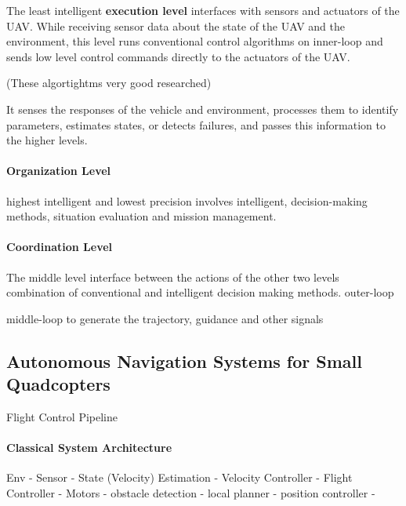 The least intelligent \textbf{execution level}
interfaces with sensors and actuators
of the UAV. While receiving sensor data about
the state of the UAV and the environment,
this level runs conventional  control  algorithms 
on inner-loop and sends low level control
commands directly to the actuators of the UAV.



(These algortightms very good researched)




It  senses  the  responses  of  the  vehicle  and  environment,    
processes    them    to    identify    parameters,    
estimates   states,   or   detects   failures,   
and   passes   this   information to the higher levels.


\paragraph{Organization Level}

highest   intelligent    and    lowest    precision
involves    intelligent,    decision-making  methods,  
situation  evaluation  and  mission  management. 




\paragraph{Coordination Level}

The  middle  level
interface between the actions of the other  two  levels  
combination  of  conventional  and   intelligent   decision   making   methods.   
outer-loop

middle-loop  to  generate  the  trajectory,  guidance  and  other  signals






\subsection{Autonomous Navigation Systems for Small Quadcopters}
Flight Control Pipeline


\paragraph{Classical System Architecture}
Env - Sensor - State (Velocity) Estimation                              - Velocity Controller - Flight Controller - Motors
             - obstacle detection - local planner - position controller -


